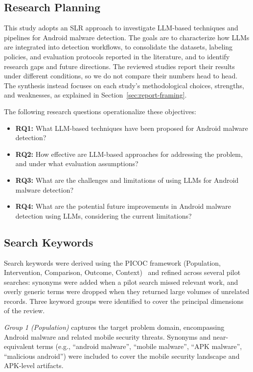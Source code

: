 \subsection{Research Planning}\label{sec:rqs}

This study adopts an SLR approach to investigate LLM-based techniques and pipelines for Android malware detection. The goals are to characterize how LLMs are integrated into detection workflows, to consolidate the datasets, labeling policies, and evaluation protocols reported in the literature, and to identify research gaps and future directions. The reviewed studies report their results under different conditions, so we do not compare their numbers head to head. The synthesis instead focuses on each study's methodological choices, strengths, and weaknesses, as explained in Section~\ref{sec:report-framing}.

The following research questions operationalize these objectives:

\begin{itemize}
    \item \textbf{RQ1:} What LLM-based techniques have been proposed for Android malware detection?
    \item \textbf{RQ2:} How effective are LLM-based approaches for addressing the problem, and under what evaluation assumptions?
    \item \textbf{RQ3:} What are the challenges and limitations of using LLMs for Android malware detection?
    \item \textbf{RQ4:} What are the potential future improvements in Android malware detection using LLMs, considering the current limitations?
\end{itemize}

\subsection{Search Keywords}\label{sec:keywords}

Search keywords were derived using the PICOC framework (Population, Intervention, Comparison, Outcome, Context)~\cite{petticrew2008systematic} and refined across several pilot searches: synonyms were added when a pilot search missed relevant work, and overly generic terms were dropped when they returned large volumes of unrelated records. Three keyword groups were identified to cover the principal dimensions of the review.

\textit{Group 1 (Population)} captures the target problem domain, encompassing Android malware and related mobile security threats. Synonyms and near-equivalent terms (e.g., ``android malware'', ``mobile malware'', ``APK malware'', ``malicious android'') were included to cover the mobile security landscape and APK-level artifacts.

